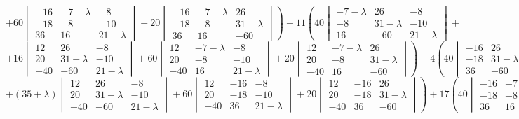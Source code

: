 \documentclass{article}
\newcommand{\la}{\lambda}
\begin{document}
$$\left.+60\begin{vmatrix}
-16 & -7-\la & -8 \\
-18 & -8 & -10 \\
36 & 16 & 21-\la
\end{vmatrix}+20\begin{vmatrix}
-16 & -7-\la & 26 \\
-18 & -8 & 31-\la \\
36 & 16 & -60
\end{vmatrix}\right)-11\left(40\begin{vmatrix}
-7-\la & 26 & -8 \\
-8 & 31-\la & -10 \\
16 & -60 & 21-\la
\end{vmatrix}+\right.$$
$$\left.+16\begin{vmatrix}
12 & 26 & -8 \\
20 & 31-\la & -10 \\
-40 & -60 & 21-\la
\end{vmatrix}+60\begin{vmatrix}
12 & -7-\la & -8 \\
20 & -8 & -10 \\
-40 & 16 & 21-\la
\end{vmatrix}+20\begin{vmatrix}
12 & -7-\la & 26\\
20 & -8 & 31-\la \\
-40 & 16 & -60
\end{vmatrix}\right)+4\left(40\begin{vmatrix}
-16 & 26 & -8 \\
-18 & 31-\la & -10 \\
36 & -60 & 21-\la
\end{vmatrix}+\right.$$
$$\left.+(35+\la)\begin{vmatrix}
12 & 26 & -8 \\
20 & 31-\la & -10 \\
-40 & -60 & 21-\la
\end{vmatrix}+60\begin{vmatrix}
12 & -16 & -8 \\
20 & -18 & -10 \\
-40 & 36 & 21-\la
\end{vmatrix}+20\begin{vmatrix}
12 & -16 & 26 \\
20 & -18 & 31-\la \\
-40 & 36 & -60 
\end{vmatrix}\right)+17\left(40\begin{vmatrix}
-16 & -7-\la & -8 \\
-18 & -8 & -10 \\
36 & 16 & 21-\la
\end{vmatrix}+\right.$$
\end{document}
